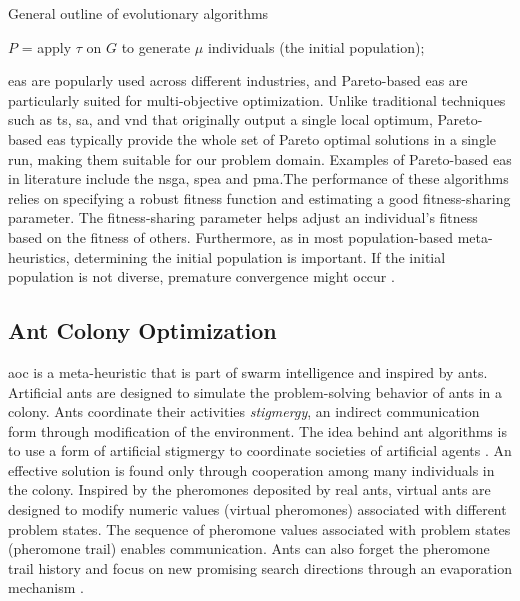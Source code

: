 \begin{algorithm}
  \caption{General outline of evolutionary algorithms}\label{alg:ea}
  $P$ = apply $\tau$ on $G$ to generate $\mu$ individuals (the initial population);\\
  \end{algorithm}

\Glspl{ea} are popularly used across different industries, and Pareto-based \glspl{ea} are particularly suited for multi-objective optimization. Unlike traditional techniques such as \gls{ts}, \gls{sa}, and \gls{vnd}  that originally output a single local optimum, Pareto-based \glspl{ea} typically provide the whole set of Pareto optimal solutions in a single run, making them suitable for our problem domain. Examples of Pareto-based \glspl{ea} in literature include the \gls{nsga}, \gls{spea} and \gls{pma}.The performance of these algorithms relies on specifying a robust fitness function and estimating a good fitness-sharing parameter. The fitness-sharing parameter helps adjust an individual’s fitness based on the fitness of others. Furthermore, as in most population-based meta-heuristics, determining the initial population is important. If the initial population is not diverse, premature convergence might occur \parencite{Talbi2009Metaheuristics:Implementation}.

\subsection{Ant Colony Optimization}
\Gls{aoc} is a meta-heuristic that is part of swarm intelligence and inspired by ants. Artificial ants are designed to simulate the problem-solving behavior of ants in a colony. Ants coordinate their activities \textit{stigmergy}, an indirect communication form through modification of the environment. The idea behind ant algorithms is to use a form of artificial stigmergy to coordinate societies of artificial agents \parencite{Dorigo2018TheMetaheuristic}. An effective solution is found only through cooperation among many individuals in the colony. Inspired by the pheromones deposited by real ants, virtual ants are designed to modify numeric values (virtual pheromones) associated with different problem states. The sequence of pheromone values associated with problem states (pheromone trail) enables communication. Ants can also forget the pheromone trail history and focus on new promising search directions through an evaporation mechanism \parencite{Gonzalez2007HandbookMetaheuristics}. 

